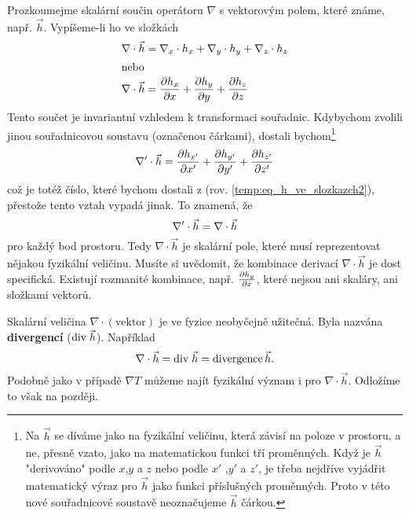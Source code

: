       Prozkoumejme skalární součin operátoru $\nabla$ s vektorovým polem, které známe, např. $\vec{h}$. 
      Vypíšeme-li ho ve složkách
      \begin{align}
        \nabla\cdot\vec{h} &= \nabla_x\cdot h_x +
                      \nabla_y\cdot h_y +
                      \nabla_z\cdot h_z               \label{temp:eq_h_ve_slozkach}     \\
        \shortintertext{nebo}
        \nabla\cdot\vec{h} &= \frac{\partial h_x}{\partial x} +
                      \frac{\partial h_y}{\partial y} +
                      \frac{\partial h_z}{\partial z}                   \label{temp:eq_h_ve_slozkazch2}
      \end{align}
      Tento součet je invariantní vzhledem k transformaci souřadnic. Kdybychom zvolili jinou souřadnicovou 
      soustavu (označenou čárkami), dostali bychom\footnote{Na $\vec{h}$ se díváme jako na fyzikální 
      veličinu, která závisí na poloze v prostoru, a ne, přesně vzato, jako na matematickou funkci tří 
      proměnných. Když je $\vec{h}$ "derivováno" podle $x$,$y$ a $z$ nebo podle $x'$ ,$y'$ a $z'$, je třeba 
      nejdříve vyjádřit matematický výraz pro $\vec{h}$ jako funkci příslušných proměnných. Proto v této 
      nové souřadnicové soustavě neoznačujeme $\vec{h}$ čárkou.}
      \begin{equation}\label{temp:eq_h_ve_slozkazch3}
        \nabla'\cdot\vec{h}=\frac{\partial h_{x'}}{\partial x'}+\frac{\partial h_{y'}}{\partial y'}+\frac{\partial h_{z'}}{\partial z'}
      \end{equation}
      což je totéž číslo, které bychom dostali z (rov. \ref{temp:eq_h_ve_slozkazch2}), přestože tento vztah 
      vypadá jinak. To znamená, že
      \begin{equation}\label{temp:eq_rovnost_h}
         \nabla'\cdot\vec{h}= \nabla\cdot\vec{h}
      \end{equation}
      pro každý bod prostoru. Tedy $\nabla\cdot\vec{h}$ je skalární pole, které musí reprezentovat nějakou 
      fyzikální veličinu. Musíte si uvědomit, že kombinace derivací $\nabla\cdot\vec{h}$ je dost 
      specifická.  Existují rozmanité kombinace, např. $\frac{\partial h_y}{\partial x}$, které nejsou ani skaláry, ani 
      složkami vektorů.

      Skalární veličina $\nabla\cdot(\text{vektor})$ je ve fyzice neobyčejně užitečná. Byla nazvána
      \textbf{divergencí} ($\mathrm{div}\;\vec{h}$). Například
      \begin{equation}\label{temp:eq_div_h}
        \nabla\cdot\vec{h}= \mathrm{div}\;\vec{h}=\text{divergence}\, \vec{h}.
      \end{equation}
      Podobně jako v případě $\nabla T$ můžeme najít fyzikální význam i pro $\nabla\cdot\vec{h}$.
      Odložíme to však na později.

